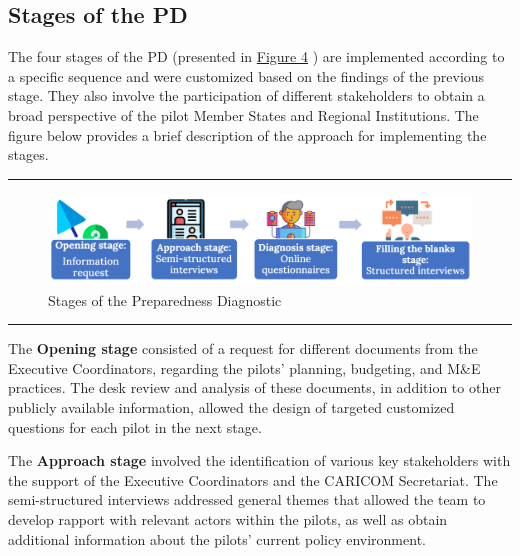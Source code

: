 \documentclass[
  10pt,
]{book}
\begin{document}
\hypertarget{stages-of-the-pd}{%
\subsection*{Stages of the PD}\label{stages-of-the-pd}}

The four stages of the PD (presented in \protect\hyperlink{fig:figure4}{Figure 4} ) are implemented according to a specific sequence and were customized based on the findings of the previous stage. They also involve the participation of different stakeholders to obtain a broad perspective of the pilot Member States and Regional Institutions. The figure below provides a brief description of the approach for implementing the stages.

\begin{center}\rule{0.5\linewidth}{0.5pt}\end{center}

\begin{figure}

{\centering \includegraphics[width=1\linewidth]{./images/figure_4} 

}

\caption{Stages of the Preparedness Diagnostic}\label{fig:figure4}
\end{figure}

\begin{center}\rule{0.5\linewidth}{0.5pt}\end{center}

The \textbf{Opening stage} consisted of a request for different documents from the Executive Coordinators, regarding the pilots' planning, budgeting, and M\&E practices. The desk review and analysis of these documents, in addition to other publicly available information, allowed the design of targeted customized questions for each pilot in the next stage.

The \textbf{Approach stage} involved the identification of various key stakeholders with the support of the Executive Coordinators and the CARICOM Secretariat. The semi-structured interviews addressed general themes that allowed the team to develop rapport with relevant actors within the pilots, as well as obtain additional information about the pilots' current policy environment.
\end{document}
